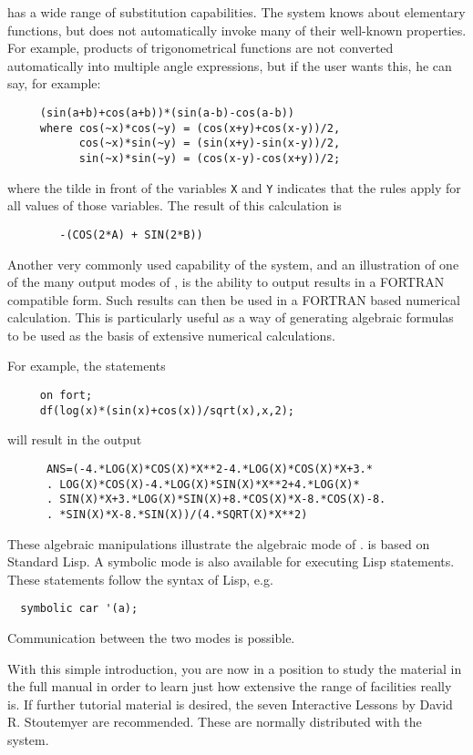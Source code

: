 {\REDUCE} has a wide range of substitution capabilities. The system knows
about elementary functions, but does not automatically invoke many of their
well-known properties. For example, products of trigonometrical functions
are not converted automatically into multiple angle expressions, but if the
user wants this, he can say, for example:
\begin{verbatim}
     (sin(a+b)+cos(a+b))*(sin(a-b)-cos(a-b))
	 where cos(~x)*cos(~y) = (cos(x+y)+cos(x-y))/2,
	       cos(~x)*sin(~y) = (sin(x+y)-sin(x-y))/2,
	       sin(~x)*sin(~y) = (cos(x-y)-cos(x+y))/2;
\end{verbatim}
where the tilde in front of the variables {\tt X} and {\tt Y} indicates
that the rules apply for all values of those variables.
The result of this calculation is
\begin{verbatim}
        -(COS(2*A) + SIN(2*B))
\end{verbatim}

Another very commonly used capability of the system, and an illustration
of one of the many output modes of {\REDUCE}, is the ability to output
results in a FORTRAN compatible form.  Such results can then be used in a
FORTRAN based numerical calculation.  This is particularly useful as a way
of generating algebraic formulas to be used as the basis of extensive
numerical calculations.

For example, the statements
\begin{verbatim}
     on fort;
     df(log(x)*(sin(x)+cos(x))/sqrt(x),x,2);
\end{verbatim}
will result in the output
\begin{verbatim}
      ANS=(-4.*LOG(X)*COS(X)*X**2-4.*LOG(X)*COS(X)*X+3.*
      . LOG(X)*COS(X)-4.*LOG(X)*SIN(X)*X**2+4.*LOG(X)*
      . SIN(X)*X+3.*LOG(X)*SIN(X)+8.*COS(X)*X-8.*COS(X)-8.
      . *SIN(X)*X-8.*SIN(X))/(4.*SQRT(X)*X**2)
\end{verbatim}
These algebraic manipulations illustrate the algebraic mode of {\REDUCE}.
{\REDUCE} is based on Standard Lisp. A symbolic mode is also available for
executing Lisp statements. These statements follow the syntax of Lisp,
e.g.
\begin{verbatim}
  symbolic car '(a);
\end{verbatim}
Communication between the two modes is possible.

With this simple introduction, you are now in a position to study the
material in the full {\REDUCE} manual in order to learn just how extensive
the range of facilities really is.  If further tutorial material is
desired, the seven {\REDUCE} Interactive Lessons by David R. Stoutemyer are
recommended.  These are normally distributed with the system.

